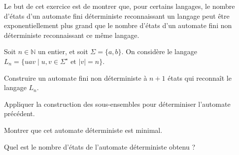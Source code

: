 
\begingroup

\begin{exercice}\label{exo:lexing/determinisation/challenge}

  Le but de cet exercice est de montrer que, pour certains langages,
  le nombre d'états d'un automate fini déterministe reconnaissant un langage
  peut être exponentiellement plus grand que le nombre d'états
  d'un automate fini non déterministe reconnaissant ce même langage.

  Soit $n\in \mathbb{N}$ un entier, et soit $\Sigma = \{a, b\}$.
  On considère le langage $L_n = \{u a v \mid u, v \in \Sigma^\star \text{ et } |v| = n \}$.

  \begin{questions}
  \item Construire un automate fini non déterministe à $n+1$ états qui reconnaît le langage $L_n$.
  \item Appliquer la construction des sous-ensembles pour déterminiser l'automate précédent. 
  \item Montrer que cet automate déterministe est minimal.
  \item Quel est le nombre d'états de l'automate déterministe obtenu ? 
  \end{questions}

\end{exercice}

